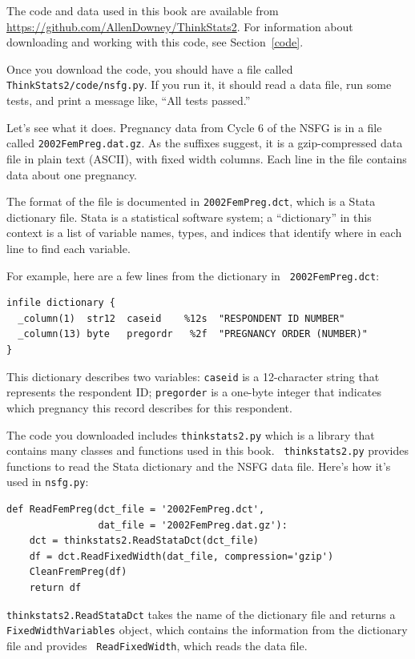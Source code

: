 \documentclass[12pt]{book}
\begin{document}
The code and data used in this book are available from
\url{https://github.com/AllenDowney/ThinkStats2}.
  For information
about downloading and working with this code, see Section~\ref{code}.

Once you download the code, you should have a file called {\tt
  ThinkStats2/code/nsfg.py}.  If you run it, it should read a data
file, run some tests, and print a message like, ``All tests passed.''

Let's see what it does.  Pregnancy data from Cycle 6 of the NSFG is in
a file called {\tt 2002FemPreg.dat.gz}.  As the suffixes suggest, it
is a gzip-compressed data file in plain text (ASCII), with fixed width
columns.  Each line in the file contains data about one pregnancy.

The format of the file is documented in {\tt 2002FemPreg.dct}, which
is a Stata dictionary file.  Stata is a statistical software system;
a ``dictionary'' in this context is a list of variable names, types,
and indices that identify where in each line to find each variable.

For example, here are a few lines from the dictionary in {\tt
  2002FemPreg.dct}:
%
\begin{verbatim}
infile dictionary {
  _column(1)  str12  caseid    %12s  "RESPONDENT ID NUMBER"
  _column(13) byte   pregordr   %2f  "PREGNANCY ORDER (NUMBER)"
}
\end{verbatim}

This dictionary describes two variables: {\tt caseid} is a 12-character
string that represents the respondent ID; {\tt pregorder} is a 
one-byte integer that indicates which pregnancy this record
describes for this respondent.

The code you downloaded includes {\tt thinkstats2.py} which is a library
that contains many classes and functions used in this book.  {\tt
  thinkstats2.py} provides functions to read the Stata dictionary and
the NSFG data file.  Here's how it's used in {\tt nsfg.py}:

\begin{verbatim}
def ReadFemPreg(dct_file = '2002FemPreg.dct',
                dat_file = '2002FemPreg.dat.gz'):
    dct = thinkstats2.ReadStataDct(dct_file)
    df = dct.ReadFixedWidth(dat_file, compression='gzip')
    CleanFremPreg(df)
    return df
\end{verbatim}

{\tt thinkstats2.ReadStataDct} takes the name of the dictionary file
and returns a {\tt FixedWidthVariables} object, which contains the
information from the dictionary file and provides {\tt
  ReadFixedWidth}, which reads the data file.
\end{document}
